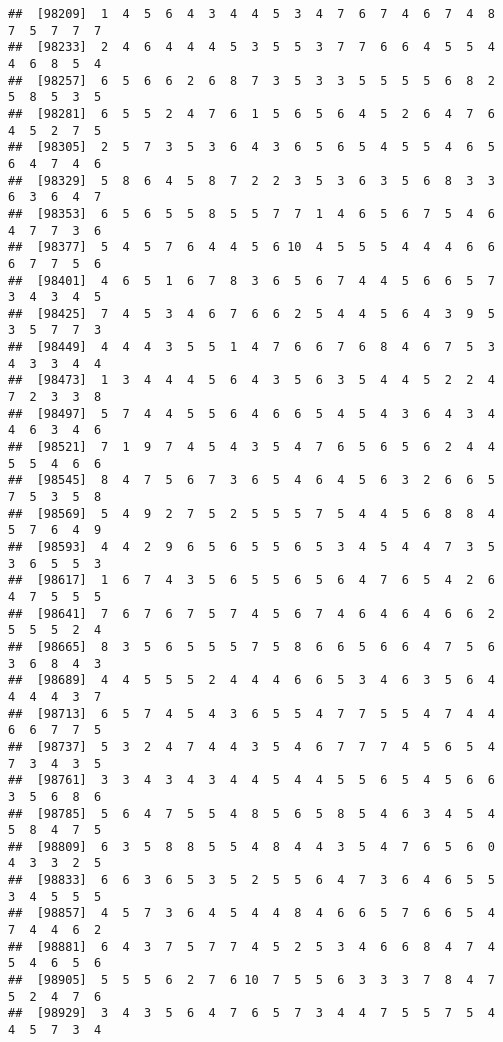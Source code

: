 \documentclass[
]{book}
\begin{document}
\begin{verbatim}
##  [98209]  1  4  5  6  4  3  4  4  5  3  4  7  6  7  4  6  7  4  8  7  5  7  7  7
##  [98233]  2  4  6  4  4  4  5  3  5  5  3  7  7  6  6  4  5  5  4  4  6  8  5  4
##  [98257]  6  5  6  6  2  6  8  7  3  5  3  3  5  5  5  5  6  8  2  5  8  5  3  5
##  [98281]  6  5  5  2  4  7  6  1  5  6  5  6  4  5  2  6  4  7  6  4  5  2  7  5
##  [98305]  2  5  7  3  5  3  6  4  3  6  5  6  5  4  5  5  4  6  5  6  4  7  4  6
##  [98329]  5  8  6  4  5  8  7  2  2  3  5  3  6  3  5  6  8  3  3  6  3  6  4  7
##  [98353]  6  5  6  5  5  8  5  5  7  7  1  4  6  5  6  7  5  4  6  4  7  7  3  6
##  [98377]  5  4  5  7  6  4  4  5  6 10  4  5  5  5  4  4  4  6  6  6  7  7  5  6
##  [98401]  4  6  5  1  6  7  8  3  6  5  6  7  4  4  5  6  6  5  7  3  4  3  4  5
##  [98425]  7  4  5  3  4  6  7  6  6  2  5  4  4  5  6  4  3  9  5  3  5  7  7  3
##  [98449]  4  4  4  3  5  5  1  4  7  6  6  7  6  8  4  6  7  5  3  4  3  3  4  4
##  [98473]  1  3  4  4  4  5  6  4  3  5  6  3  5  4  4  5  2  2  4  7  2  3  3  8
##  [98497]  5  7  4  4  5  5  6  4  6  6  5  4  5  4  3  6  4  3  4  4  6  3  4  6
##  [98521]  7  1  9  7  4  5  4  3  5  4  7  6  5  6  5  6  2  4  4  5  5  4  6  6
##  [98545]  8  4  7  5  6  7  3  6  5  4  6  4  5  6  3  2  6  6  5  7  5  3  5  8
##  [98569]  5  4  9  2  7  5  2  5  5  5  7  5  4  4  5  6  8  8  4  5  7  6  4  9
##  [98593]  4  4  2  9  6  5  6  5  5  6  5  3  4  5  4  4  7  3  5  3  6  5  5  3
##  [98617]  1  6  7  4  3  5  6  5  5  6  5  6  4  7  6  5  4  2  6  4  7  5  5  5
##  [98641]  7  6  7  6  7  5  7  4  5  6  7  4  6  4  6  4  6  6  2  5  5  5  2  4
##  [98665]  8  3  5  6  5  5  5  7  5  8  6  6  5  6  6  4  7  5  6  3  6  8  4  3
##  [98689]  4  4  5  5  5  2  4  4  4  6  6  5  3  4  6  3  5  6  4  4  4  4  3  7
##  [98713]  6  5  7  4  5  4  3  6  5  5  4  7  7  5  5  4  7  4  4  6  6  7  7  5
##  [98737]  5  3  2  4  7  4  4  3  5  4  6  7  7  7  4  5  6  5  4  7  3  4  3  5
##  [98761]  3  3  4  3  4  3  4  4  5  4  4  5  5  6  5  4  5  6  6  3  5  6  8  6
##  [98785]  5  6  4  7  5  5  4  8  5  6  5  8  5  4  6  3  4  5  4  5  8  4  7  5
##  [98809]  6  3  5  8  8  5  5  4  8  4  4  3  5  4  7  6  5  6  0  4  3  3  2  5
##  [98833]  6  6  3  6  5  3  5  2  5  5  6  4  7  3  6  4  6  5  5  3  4  5  5  5
##  [98857]  4  5  7  3  6  4  5  4  4  8  4  6  6  5  7  6  6  5  4  7  4  4  6  2
##  [98881]  6  4  3  7  5  7  7  4  5  2  5  3  4  6  6  8  4  7  4  5  4  6  5  6
##  [98905]  5  5  5  6  2  7  6 10  7  5  5  6  3  3  3  7  8  4  7  5  2  4  7  6
##  [98929]  3  4  3  5  6  4  7  6  5  7  3  4  4  7  5  5  7  5  4  4  5  7  3  4

\end{verbatim}
\end{document}
